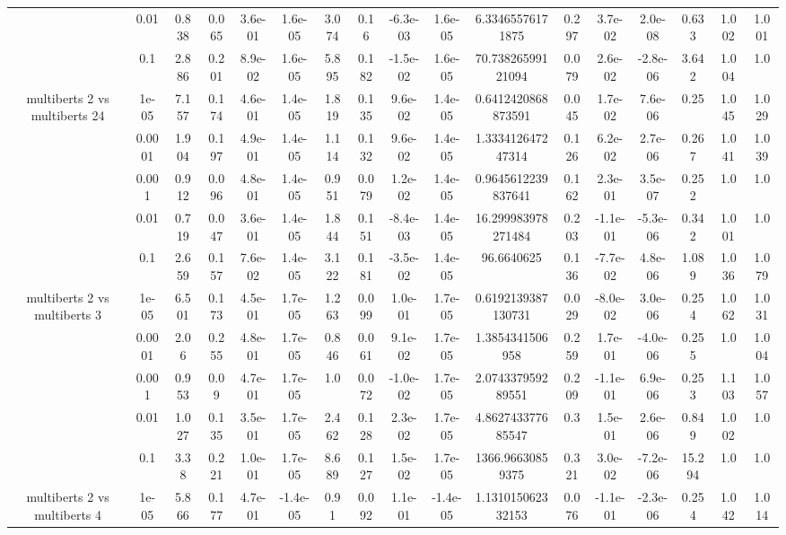 \begin{tabular}{|c|c|c|c|c|c|c|c|c|c|c|c|c|c|c|c|c|}
 & 0.01 & 0.838 & 0.065 & 3.6e-01 & 1.6e-05 & 3.074 & 0.16 & -6.3e-03 & 1.6e-05 & 6.33465576171875 & 0.297 & 3.7e-02 & 2.0e-08 & 0.633 & 1.002 & 1.001 \\
 & 0.1 & 2.886 & 0.201 & 8.9e-02 & 1.6e-05 & 5.895 & 0.182 & -1.5e-02 & 1.6e-05 & 70.73826599121094 & 0.079 & 2.6e-02 & -2.8e-06 & 3.642 & 1.004 & 1.0 \\
\hline
\multirow{5}{*}{multiberts 2 vs multiberts 24} & 1e-05 & 7.157 & 0.174 & 4.6e-01 & 1.4e-05 & 1.819 & 0.135 & 9.6e-02 & 1.4e-05 & 0.6412420868873591 & 0.045 & 1.7e-02 & 7.6e-06 & 0.25 & 1.045 & 1.029 \\
 & 0.0001 & 1.904 & 0.197 & 4.9e-01 & 1.4e-05 & 1.114 & 0.132 & 9.6e-02 & 1.4e-05 & 1.333412647247314 & 0.126 & 6.2e-02 & 2.7e-06 & 0.267 & 1.041 & 1.039 \\
 & 0.001 & 0.912 & 0.096 & 4.8e-01 & 1.4e-05 & 0.951 & 0.079 & 1.2e-02 & 1.4e-05 & 0.9645612239837641 & 0.162 & 2.3e-01 & 3.5e-07 & 0.252 & 1.0 & 1.0 \\
 & 0.01 & 0.719 & 0.047 & 3.6e-01 & 1.4e-05 & 1.844 & 0.151 & -8.4e-03 & 1.4e-05 & 16.299983978271484 & 0.203 & -1.1e-01 & -5.3e-06 & 0.342 & 1.001 & 1.0 \\
 & 0.1 & 2.659 & 0.157 & 7.6e-02 & 1.4e-05 & 3.122 & 0.181 & -3.5e-02 & 1.4e-05 & 96.6640625 & 0.136 & -7.7e-02 & 4.8e-06 & 1.089 & 1.036 & 1.079 \\
\hline
\multirow{5}{*}{multiberts 2 vs multiberts 3} & 1e-05 & 6.501 & 0.173 & 4.5e-01 & 1.7e-05 & 1.263 & 0.099 & 1.0e-01 & 1.7e-05 & 0.6192139387130731 & 0.029 & -8.0e-02 & 3.0e-06 & 0.254 & 1.062 & 1.031 \\
 & 0.0001 & 2.06 & 0.255 & 4.8e-01 & 1.7e-05 & 0.846 & 0.061 & 9.1e-02 & 1.7e-05 & 1.3854341506958 & 0.259 & 1.7e-01 & -4.0e-06 & 0.255 & 1.0 & 1.004 \\
 & 0.001 & 0.953 & 0.09 & 4.7e-01 & 1.7e-05 & 1.0 & 0.072 & -1.0e-02 & 1.7e-05 & 2.074337959289551 & 0.209 & -1.1e-01 & 6.9e-06 & 0.253 & 1.103 & 1.057 \\
 & 0.01 & 1.027 & 0.135 & 3.5e-01 & 1.7e-05 & 2.462 & 0.128 & 2.3e-02 & 1.7e-05 & 4.862743377685547 & 0.3 & 1.5e-01 & 2.6e-06 & 0.849 & 1.002 & 1.0 \\
 & 0.1 & 3.38 & 0.221 & 1.0e-01 & 1.7e-05 & 8.689 & 0.127 & 1.5e-02 & 1.7e-05 & 1366.96630859375 & 0.321 & 3.0e-02 & -7.2e-06 & 15.294 & 1.0 & 1.0 \\
\hline
\multirow{5}{*}{multiberts 2 vs multiberts 4} & 1e-05 & 5.866 & 0.177 & 4.7e-01 & -1.4e-05 & 0.91 & 0.092 & 1.1e-01 & -1.4e-05 & 1.131015062332153 & 0.076 & -1.1e-01 & -2.3e-06 & 0.254 & 1.042 & 1.014 \\

\end{tabular}
